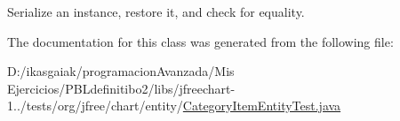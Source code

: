 Serialize an instance, restore it, and check for equality. 

The documentation for this class was generated from the following file\+:\begin{DoxyCompactItemize}
\item 
D\+:/ikasgaiak/programacion\+Avanzada/\+Mis Ejercicios/\+P\+B\+Ldefinitibo2/libs/jfreechart-\/1../tests/org/jfree/chart/entity/\mbox{\hyperlink{_category_item_entity_test_8java}{Category\+Item\+Entity\+Test.\+java}}\end{DoxyCompactItemize}
